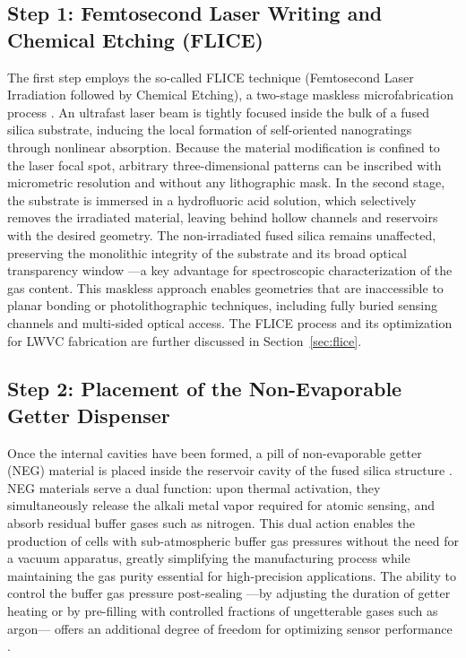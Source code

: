 \subsection*{Step 1: Femtosecond Laser Writing and Chemical Etching (FLICE)}
The first step employs the so-called FLICE technique (Femtosecond Laser Irradiation 
followed by Chemical Etching), a two-stage maskless microfabrication process 
\cite{lucivero2022}. An ultrafast laser beam is tightly focused inside the bulk of a 
fused silica substrate, inducing the local formation of self-oriented nanogratings 
through nonlinear absorption. Because the material modification is confined to the 
laser focal spot, arbitrary three-dimensional patterns can be inscribed with 
micrometric resolution and without any lithographic mask. In the second stage, the 
substrate is immersed in a hydrofluoric acid solution, which selectively removes the 
irradiated material, leaving behind hollow channels and reservoirs with the desired 
geometry. The non-irradiated fused silica remains unaffected, preserving the 
monolithic integrity of the substrate and its broad optical transparency window ---a 
key advantage for spectroscopic characterization of the gas content. This maskless 
approach enables geometries that are inaccessible to planar bonding or 
photolithographic techniques, including fully buried sensing channels and multi-sided 
optical access. The FLICE process and its optimization for LWVC fabrication are 
further discussed in Section~\ref{sec:flice}.
\subsection*{Step 2: Placement of the Non-Evaporable Getter Dispenser}
Once the internal cavities have been formed, a pill of non-evaporable getter (NEG) 
material is placed inside the reservoir cavity of the fused silica structure 
\cite{lucivero2022}. \gls{NEG} materials serve a dual function: upon thermal activation, 
they simultaneously release the alkali metal vapor required 
for atomic sensing, and absorb residual buffer gases such as nitrogen. This dual 
action enables the production of cells with sub-atmospheric buffer gas pressures 
without the need for a vacuum apparatus, greatly simplifying the manufacturing 
process while maintaining the gas purity essential for high-precision applications. 
The ability to control the buffer gas pressure post-sealing ---by adjusting the duration 
of getter heating or by pre-filling with controlled fractions of ungetterable gases 
such as argon--- offers an additional degree of freedom for optimizing sensor 
performance \cite{lucivero2022}.
